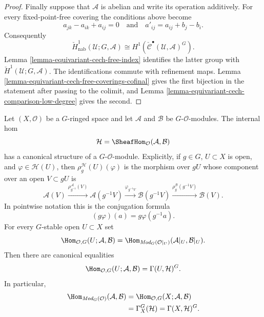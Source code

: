 \begin{proof}
Finally suppose that $\mathcal A$ is abelian and write its operation
additively. For every fixed-point-free covering the conditions above
become
$$
a_{jk}-a_{ik}+a_{ij}=0
\quad\text{and}\quad
a'_{ij}=a_{ij}+b_j-b_i.
$$
Consequently
$$
\check H^1_{\mathrm{nab}}(\mathcal U;G,\mathcal A)
\cong
H^1\left(\check{\mathcal C}^\bullet(
\mathcal U,\mathcal A)^G\right).
$$
Lemma \ref{lemma-equivariant-cech-free-index} identifies the latter
group with $\check H^1(\mathcal U;G,\mathcal A)$. The identifications
commute with refinement maps. Lemma
\ref{lemma-equivariant-cech-free-coverings-cofinal} gives the first
bijection in the statement after passing to the colimit, and Lemma
\ref{lemma-equivariant-cech-comparison-low-degree} gives the second.
\end{proof}


\begin{lemma}
\label{lemma-equivariant-internal-hom}
\begin{reference}
\cite[Chapter V, \S 5.6, pp. 213--214 and 216]{Tohoku}
\end{reference}
Let $(X, \mathcal O)$ be a $G$-ringed space and let $\mathcal A$ and
$\mathcal B$ be $G$-$\mathcal O$-modules. The internal hom
$$
\mathcal H=\SheafHom_{\mathcal O}(\mathcal A,\mathcal B)
$$
has a canonical structure of a $G$-$\mathcal O$-module. Explicitly, if
$g\in G$, $U\subset X$ is open, and $\varphi\in\mathcal H(U)$, then
$\rho_g^{\mathcal H}(U)(\varphi)$ is the morphism over $gU$ whose component
over an open $V\subset gU$ is
$$
\mathcal A(V)
\xrightarrow{\rho_{g^{-1}}^{\mathcal A}(V)}
\mathcal A(g^{-1}V)
\xrightarrow{\varphi_{g^{-1}V}}
\mathcal B(g^{-1}V)
\xrightarrow{\rho_g^{\mathcal B}(g^{-1}V)}
\mathcal B(V).
$$
In pointwise notation this is the conjugation formula
$$
(g\varphi)(a)=g\varphi(g^{-1}a).
$$
For every $G$-stable open $U\subset X$ set
$$
\Hom_{\mathcal O,G}(U;\mathcal A,\mathcal B)=
\Hom_{\textit{Mod}_G(\mathcal O|_U)}
(\mathcal A|_U,\mathcal B|_U).
$$
Then there are canonical equalities
$$
\Hom_{\mathcal O,G}(U;\mathcal A,\mathcal B)=
\Gamma(U,\mathcal H)^G.
$$
In particular,
$$
\begin{aligned}
\Hom_{\textit{Mod}_G(\mathcal O)}(\mathcal A,\mathcal B)
&=\Hom_{\mathcal O,G}(X;\mathcal A,\mathcal B) \\
&=\Gamma_X^G(\mathcal H)
=\Gamma(X,\mathcal H)^G.
\end{aligned}
$$
\end{lemma}

